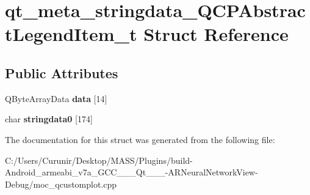 \hypertarget{structqt__meta__stringdata___q_c_p_abstract_legend_item__t}{}\section{qt\+\_\+meta\+\_\+stringdata\+\_\+\+Q\+C\+P\+Abstract\+Legend\+Item\+\_\+t Struct Reference}
\label{structqt__meta__stringdata___q_c_p_abstract_legend_item__t}
\subsection*{Public Attributes}
\begin{DoxyCompactItemize}
\item 
\mbox{\label{structqt__meta__stringdata___q_c_p_abstract_legend_item__t_abecf8f45bdc698c93d55fa165e6e2a92}} 
Q\+Byte\+Array\+Data {\bfseries data} \mbox{[}14\mbox{]}
\item 
\mbox{\label{structqt__meta__stringdata___q_c_p_abstract_legend_item__t_a50942a22daf54e477794ee3d49877fdd}} 
char {\bfseries stringdata0} \mbox{[}174\mbox{]}
\end{DoxyCompactItemize}


The documentation for this struct was generated from the following file\+:\begin{DoxyCompactItemize}
\item 
C\+:/\+Users/\+Curunir/\+Desktop/\+M\+A\+S\+S/\+Plugins/build-\/\+Android\+\_\+armeabi\+\_\+v7a\+\_\+\+G\+C\+C\+\_\+\_\+\_\+\+Qt\+\_\+\_\+\_-\/\+A\+R\+Neural\+Network\+View-\/\+Debug/moc\+\_\+qcustomplot.\+cpp\end{DoxyCompactItemize}
